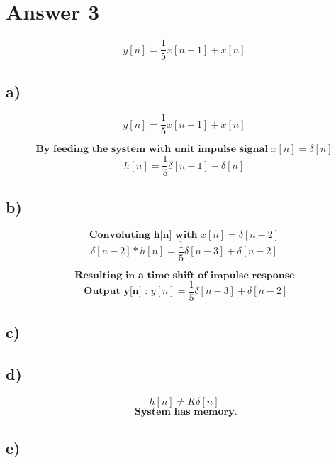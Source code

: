 \documentclass[12pt]{article}
\begin{document}
\section*{Answer 3}

\[ y[n] = \frac{1}{5}x[n-1] + x[n] \]

\subsection*{a)} 

\[ y[n] = \frac{1}{5}x[n-1] + x[n] \]

\[ \textbf{By feeding the system with unit impulse signal } x[n] = \delta [n] \]
\[ h[n] = \frac{1}{5} \delta[n-1] + \delta[n] \]

\subsection*{b)} 

\[ \textbf{Convoluting h[n] with } x[n] = \delta [n-2] \]
\[ \delta [n-2] * h[n] = \frac{1}{5} \delta[n-3] + \delta[n-2] \]

\[ \textbf{ Resulting in a time shift of impulse response.} \]
\[ \textbf{ Output y[n] : } y[n] =  \frac{1}{5} \delta[n-3] + \delta[n-2] \]

\subsection*{c)}


\subsection*{d)}

\[ h[n] \neq K \delta [n] \]
\[ \textbf{ System has memory.} \]
\subsection*{e)}
\end{document}
